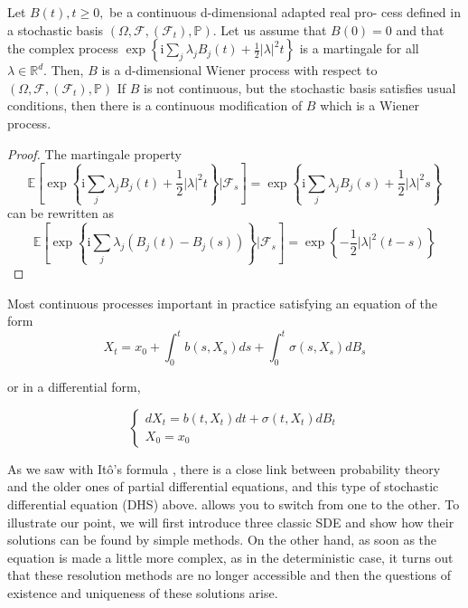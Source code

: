 	\begin{theorem}\label{thm:condition_brownian_motion}
		Let $B(t), t \geq 0,$ be a continuous d-dimensional adapted real pro-
		cess defined in a stochastic basis $\left(\Omega, \mathcal{F},\left(\mathcal{F}_{t}\right), \mathbb{P}\right) .$ Let us assume that $B(0)=0$ and that the complex process $\operatorname{exp}\left\{\mathrm{i} \sum_{j} \lambda_{j} B_{j}(t)+\frac{1}{2}|\lambda|^{2} t\right\}$ is a martingale for all
		$\lambda \in \mathbb{R}^{d} .$ Then, $B$ is a d-dimensional Wiener process with respect to $\left(\Omega, \mathcal{F},\left(\mathcal{F}_{t}\right), \mathbb{P}\right)$
		If $B$ is not continuous, but the stochastic basis satisfies usual conditions, then there
		is a continuous modification of $B$ which is a Wiener process.
	\end{theorem}
	\begin{proof}
		The martingale property
		$$
		\mathbb{E}\left[\exp \left\{\mathrm{i} \sum_{j} \lambda_{j} B_{j}(t)+\frac{1}{2}|\lambda|^{2} t\right\} | \mathcal{F}_{s}\right]=\exp \left\{\mathrm{i} \sum_{j} \lambda_{j} B_{j}(s)+\frac{1}{2}|\lambda|^{2} s\right\}
		$$
		can be rewritten as
		$$
		\mathbb{E}\left[\exp \left\{\mathrm{i} \sum_{j} \lambda_{j}\left(B_{j}(t)-B_{j}(s)\right)\right\} | \mathcal{F}_{s}\right]=\exp \left\{-\frac{1}{2}|\lambda|^{2}(t-s)\right\}
		$$
	\end{proof}

	Most continuous processes important in practice satisfying an equation of the form
	$$
	X_{t}=x_{0}+\int_{0}^{t} b\left(s, X_{s}\right) d s+\int_{0}^{t} \sigma\left(s, X_{s}\right) d B_{s}
	$$

	or in a differential form,

	$$
	\left\{\begin{array}{l}
	{d X_{t}=b\left(t, X_{t}\right) d t+\sigma\left(t, X_{t}\right) d B_{t}} \\
	{X_{0}=x_{0}}
	\end{array}\right.
	$$

	As we saw with Itô's formula , there is a close link between probability theory and the older ones of partial differential equations, and this type of stochastic differential equation (DHS) above. allows you to switch from one to the other. To illustrate our point, we will first introduce three classic SDE and show how their solutions can be found by simple methods. On the other hand, as soon as the equation is made a little more complex, as in the deterministic case, it turns out that these resolution methods are no longer accessible and then the questions of existence and uniqueness of these solutions arise.

